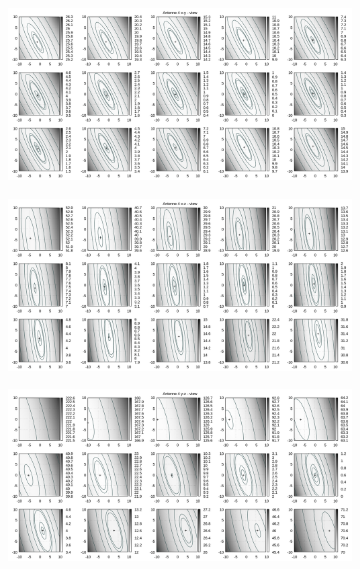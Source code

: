 \begin{appendix}
\begin{figure}[!ht]
\begin{subfigure}[t]{0.3\textwidth}
	\end{subfigure}
\end{figure}
%
\newpage
\begin{figure}[!ht]
	\centering
	\begin{subfigure}[t]{0.3\textwidth}
	     \centering
	     \includegraphics[width=\textwidth]{img/fitness/xy/a4.png}
	\end{subfigure}
	\begin{subfigure}[t]{0.3\textwidth}
		\centering
	     \includegraphics[width=\textwidth]{img/fitness/xz/a4.png}
	\end{subfigure}
	\begin{subfigure}[t]{0.3\textwidth}
			\centering
	   \includegraphics[width=\textwidth]{img/fitness/yz/a4.png}

\end{subfigure}
\end{figure}
\end{appendix}
